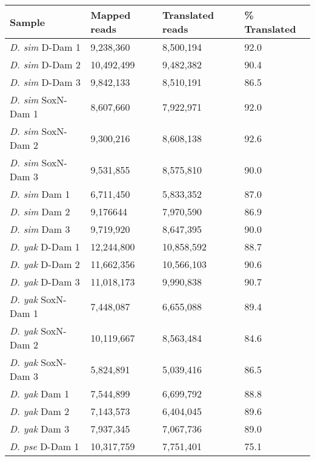 \begin{table}[th]
\centering
\begin{tabular}{|l|l|l|l|}
\hline
\textbf{Sample}            & \textbf{Mapped reads} & \textbf{Translated reads} & \textbf{\% Translated} \\ \hline
\emph{D. sim} D-Dam 1    & 9,238,360    & 8,500,194        & 92.0            \\ \hline
\emph{D. sim} D-Dam 2    & 10,492,499   & 9,482,382        & 90.4          \\ \hline
\emph{D. sim} D-Dam 3    & 9,842,133    & 8,510,191        & 86.5          \\ \hline
\emph{D. sim} SoxN-Dam 1 & 8,607,660    & 7,922,971        & 92.0            \\ \hline
\emph{D. sim} SoxN-Dam 2 & 9,300,216    & 8,608,138        & 92.6          \\ \hline
\emph{D. sim} SoxN-Dam 3 & 9,531,855    & 8,575,810        & 90.0            \\ \hline
\emph{D. sim} Dam 1      & 6,711,450    & 5,833,352        & 87.0            \\ \hline
\emph{D. sim} Dam 2      & 9,176644     & 7,970,590        & 86.9          \\ \hline
\emph{D. sim} Dam 3      & 9,719,920    & 8,647,395        & 90.0            \\ \hline
\emph{D. yak} D-Dam 1    & 12,244,800   & 10,858,592       & 88.7          \\ \hline
\emph{D. yak} D-Dam 2    & 11,662,356   & 10,566,103       & 90.6          \\ \hline
\emph{D. yak} D-Dam 3    & 11,018,173   & 9,990,838        & 90.7          \\ \hline
\emph{D. yak} SoxN-Dam 1 & 7,448,087    & 6,655,088        & 89.4          \\ \hline
\emph{D. yak} SoxN-Dam 2 & 10,119,667   & 8,563,484        & 84.6          \\ \hline
\emph{D. yak} SoxN-Dam 3 & 5,824,891    & 5,039,416        & 86.5          \\ \hline
\emph{D. yak} Dam 1      & 7,544,899    & 6,699,792        & 88.8          \\ \hline
\emph{D. yak} Dam 2      & 7,143,573    & 6,404,045        & 89.6          \\ \hline
\emph{D. yak} Dam 3      & 7,937,345    & 7,067,736        & 89.0            \\ \hline
\emph{D. pse} D-Dam 1    & 10,317,759   & 7,751,401        & 75.1          \\ \hline

\end{tabular}
\end{table}
